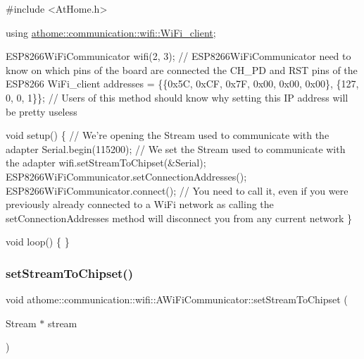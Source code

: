 \begin{DoxyCode}
\textcolor{preprocessor}{#include <AtHome.h>}

\textcolor{keyword}{using} \mbox{\hyperlink{structathome_1_1communication_1_1wifi_1_1s__wifi__client}{athome::communication::wifi::WiFi\_client}};

ESP8266WiFiCommunicator wifi(2, 3); \textcolor{comment}{// ESP8266WiFiCommunicator need to know on which pins of the board are
       connected the CH\_PD and RST pins of the ESP8266}
WiFi\_client addresses = \{\{0x5C, 0xCF, 0x7F, 0x00, 0x00, 0x00\}, \{127, 0, 0, 1\}\}; \textcolor{comment}{// Users of this method
       should know why setting this IP address will be pretty useless}

\textcolor{keywordtype}{void} setup() \{
  \textcolor{comment}{// We're opening the Stream used to communicate with the adapter}
  Serial.begin(115200);
  \textcolor{comment}{// We set the Stream used to communicate with the adapter}
  wifi.setStreamToChipset(&Serial);
  ESP8266WiFiCommunicator.setConnectionAddresses();
  ESP8266WiFiCommunicator.connect(); \textcolor{comment}{// You need to call it, even if you were previously already connected
       to a WiFi network as calling the setConnectionAddresses method will disconnect you from any current network}
\}

\textcolor{keywordtype}{void} loop() \{
\}
\end{DoxyCode}
 \mbox{\label{classathome_1_1communication_1_1wifi_1_1_a_wi_fi_communicator_a42f2ad88713db57bd9e9670f090924de}} 
\subsubsection{\texorpdfstring{set\+Stream\+To\+Chipset()}{setStreamToChipset()}}
{\footnotesize\ttfamily void athome\+::communication\+::wifi\+::\+A\+Wi\+Fi\+Communicator\+::set\+Stream\+To\+Chipset (\begin{DoxyParamCaption}\item[{Stream $\ast$}]{stream }\end{DoxyParamCaption})}


